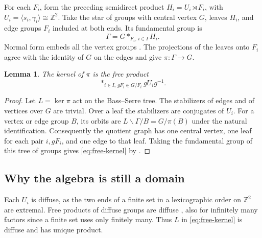 \documentclass[11pt,a4paper]{article}
\newtheorem{lemma}[theorem]{Lemma}
\numberwithin{equation}{section}
\newcommand{\Z}{\mathbb Z}
\begin{document}
For each \(F_i\), form the preceding semidirect product \(H_i=U_i\rtimes F_i\), with \(U_i=\langle s_i,\gamma_i\rangle\cong\Z^2\). Take the star of groups with central vertex \(G\), leaves \(H_i\), and edge groups \(F_i\) included at both ends. Its fundamental group is
\begin{equation}\label{eq:star}
                        \Gamma=G\mathop{\ast}_{F_i,\,i\in I}H_i .
\end{equation}
Normal form embeds all the vertex groups \cite[I.5.2, Theorem~11 and Corollary~3]{r23}. The projections of the leaves onto \(F_i\) agree with the identity of \(G\) on the edges and give \(\pi:\Gamma\to G\).

\begin{lemma}\label{lem:free-kernel}
The kernel of \(\pi\) is the free product
\begin{equation}\label{eq:free-kernel}
                  \mathop{\ast}_{i\in I,\,gF_i\in G/F_i}gU_i g^{-1}.
\end{equation}
\end{lemma}
\begin{proof}
Let \(L=\ker\pi\) act on the Bass--Serre tree. The stabilizers of edges and of vertices over \(G\) are trivial. Over a leaf the stabilizers are conjugates of \(U_i\). For a vertex or edge group \(B\), its orbits are \(L\backslash\Gamma/B=G/\pi(B)\) under the natural identification. Consequently the quotient graph has one central vertex, one leaf for each pair \(i,gF_i\), and one edge to that leaf. Taking the fundamental group of this tree of groups gives \eqref{eq:free-kernel} by \cite[I.5.4, Theorem~13]{r23}.
\end{proof}

\subsection{Why the algebra is still a domain}
Each \(U_i\) is diffuse, as the two ends of a finite set in a lexicographic order on \(\Z^2\) are extremal. Free products of diffuse groups are diffuse \cite[Theorem~1.2(2)]{r6}, also for infinitely many factors since a finite set uses only finitely many. Thus \(L\) in \eqref{eq:free-kernel} is diffuse and has unique product.
\end{document}
